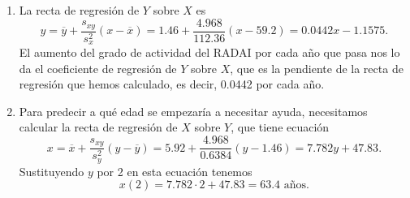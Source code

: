 {\begin{enumerate}
Con estos datos, el coeficiente de correlación lineal es
\[
r=\frac{s_{xy}}{s_xs_y}=\frac{4.968}{10.6\cdot 0.8}=0.59,
\]
que indica que existe relación lineal aunque no demasiado fuerte, sino más bien
moderada.

\item La recta de regresión de $Y$ sobre $X$ es
\[
 y=\overline{y}+\frac{s_{xy}}{s_{x}^{2}}(x-\overline{x})=1.46+\frac{4.968}{112.36}(x-59.2)=
 0.0442x-1.1575.
\]
El aumento del grado de actividad del RADAI por cada año que pasa nos lo da el
coeficiente de regresión de $Y$ sobre $X$, que es la pendiente de la recta de
regresión que hemos calculado, es decir, 0.0442 por cada año.

\item Para predecir a qué edad se empezaría a necesitar ayuda, necesitamos
calcular la recta de regresión de $X$ sobre $Y$, que tiene ecuación
\[
 x=\overline{x}+\frac{s_{xy}}{s_{y}^{2}}(y-\overline{y})=5.92+\frac{4.968}{0.6384}(y-1.46)=
 7.782y+47.83.
\]
Sustituyendo $y$ por 2 en esta ecuación tenemos
\[
x(2)=7.782\cdot 2+47.83=63.4 \textrm{ años}.
\]
\end{enumerate}}





